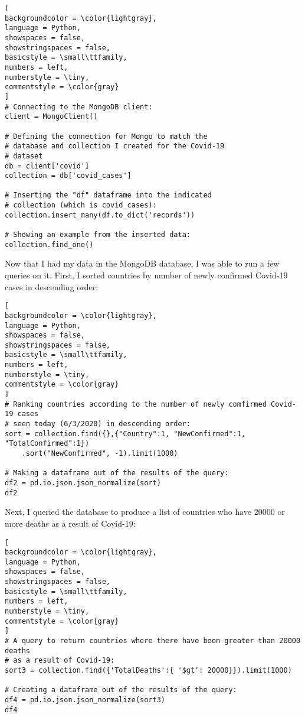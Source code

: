 \documentclass[]{article}
\begin{document}
\begin{lstlisting}[
backgroundcolor = \color{lightgray},
language = Python,
showspaces = false,
showstringspaces = false,
basicstyle = \small\ttfamily,
numbers = left,
numberstyle = \tiny,
commentstyle = \color{gray}
]
# Connecting to the MongoDB client:
client = MongoClient()

# Defining the connection for Mongo to match the
# database and collection I created for the Covid-19
# dataset
db = client['covid']
collection = db['covid_cases']

# Inserting the "df" dataframe into the indicated
# collection (which is covid_cases):
collection.insert_many(df.to_dict('records'))

# Showing an example from the inserted data:
collection.find_one()
\end{lstlisting}

Now that I had my data in the MongoDB database, I was able to run a few queries on it.  First, I sorted countries by number of newly confirmed Covid-19 cases in descending order:

\begin{lstlisting}[
backgroundcolor = \color{lightgray},
language = Python,
showspaces = false,
showstringspaces = false,
basicstyle = \small\ttfamily,
numbers = left,
numberstyle = \tiny,
commentstyle = \color{gray}
]
# Ranking countries according to the number of newly comfirmed Covid-19 cases
# seen today (6/3/2020) in descending order:
sort = collection.find({},{"Country":1, "NewConfirmed":1, "TotalConfirmed":1})
	.sort("NewConfirmed", -1).limit(1000)

# Making a dataframe out of the results of the query:
df2 = pd.io.json.json_normalize(sort)
df2
\end{lstlisting}

Next, I queried the database to produce a list of countries who have 20000 or more deaths as a result of Covid-19:

\begin{lstlisting}[
backgroundcolor = \color{lightgray},
language = Python,
showspaces = false,
showstringspaces = false,
basicstyle = \small\ttfamily,
numbers = left,
numberstyle = \tiny,
commentstyle = \color{gray}
]
# A query to return countries where there have been greater than 20000 deaths
# as a result of Covid-19:
sort3 = collection.find({'TotalDeaths':{ '$gt': 20000}}).limit(1000)

# Creating a dataframe out of the results of the query:
df4 = pd.io.json.json_normalize(sort3)
df4
\end{lstlisting}
\end{document}
